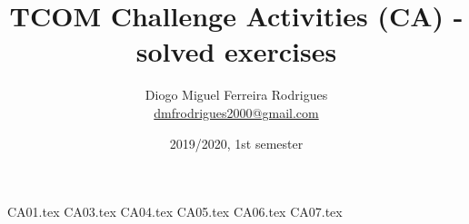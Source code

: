 \documentclass[a4paper]{article}
\title{TCOM Challenge Activities (CA) - solved exercises}
\author{Diogo Miguel Ferreira Rodrigues \\ \href{mailto:dmfrodrigues2000@gmail.com}{dmfrodrigues2000@gmail.com}}
\date{2019/2020, 1st semester}
\begin{document}
\begingroup
	\maketitle
	\let\clearpage\relax
	\setcounter{tocdepth}{2}
	\tableofcontents
\endgroup
{CA01.tex}
{CA03.tex}
{CA04.tex}
{CA05.tex}
{CA06.tex}
{CA07.tex}
\end{document}
